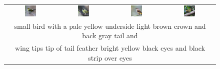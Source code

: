 \begin{figure}[ht!]
    \centering
    \vspace{-1.8cm}
    \setlength{\tabcolsep}{2.0pt}
    \begin{tabular}{cccc}
        \includegraphics[width=0.24\textwidth]{figures/cross/bird_0.jpg} &
        \includegraphics[width=0.24\textwidth]{figures/cross/bird_1.jpg} &
        \includegraphics[width=0.24\textwidth]{figures/cross/bird_2.jpg} &
        \includegraphics[width=0.24\textwidth]{figures/cross/bird_3.jpg} \vspace{-1mm} \\
        \multicolumn{4}{c}{\small small bird with a pale yellow underside light brown crown and back gray tail and }\\
        \multicolumn{4}{c}{\small wing tips tip of tail feather bright yellow black eyes and black strip over eyes}\\
        

\end{tabular}
\end{figure}
